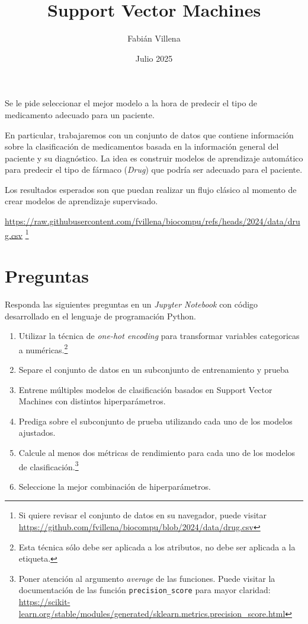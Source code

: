 \documentclass{article}
\title{Support Vector Machines}
\author{Fabián Villena}
\date{Julio 2025}
\begin{document}
\maketitle

Se le pide seleccionar el mejor modelo a la hora de predecir el tipo de medicamento adecuado para un paciente.

En particular, trabajaremos con un conjunto de datos que contiene información sobre la clasificación de medicamentos basada en la información general del paciente y su diagnóstico. La idea es construir modelos de aprendizaje automático para predecir el tipo de fármaco (\textit{Drug}) que podría ser adecuado para el paciente.

Los resultados esperados son que puedan realizar un flujo clásico al momento de crear modelos de aprendizaje supervisado. 

\begin{center}
    \url{https://raw.githubusercontent.com/fvillena/biocompu/refs/heads/2024/data/drug.csv} \footnote{Si quiere revisar el conjunto de datos en su navegador, puede visitar \url{https://github.com/fvillena/biocompu/blob/2024/data/drug.csv}}
\end{center}

\section*{Preguntas}

Responda las siguientes preguntas en un \textit{Jupyter Notebook} con código desarrollado en el lenguaje de programación Python.

\begin{enumerate}
    \item Utilizar la técnica de \textit{one-hot encoding} para transformar variables categoricas a numéricas.\footnote{Esta técnica sólo debe ser aplicada a los atributos, no debe ser aplicada a la etiqueta.}
    \item Separe el conjunto de datos en un subconjunto de entrenamiento y prueba
    \item Entrene múltiples modelos de clasificación basados en Support Vector Machines con distintos hiperparámetros.
    \item Prediga sobre el subconjunto de prueba utilizando cada uno de los modelos ajustados.
    \item Calcule al menos dos métricas de rendimiento para cada uno de los modelos de clasificación.\footnote{Poner atención al argumento \textit{average} de las funciones. Puede visitar la documentación de las función \texttt{precision\_score} para mayor claridad: \url{https://scikit-learn.org/stable/modules/generated/sklearn.metrics.precision_score.html}}
    \item Seleccione la mejor combinación de hiperparámetros.
\end{enumerate}
\end{document}
